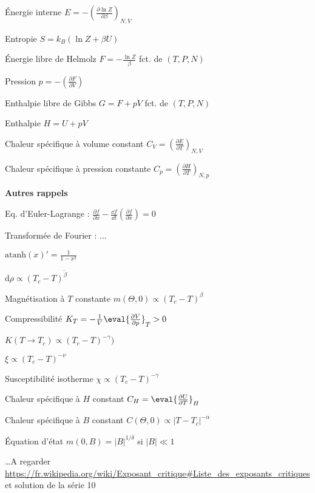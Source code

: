   \squishlist
   \item Énergie interne $E=-\left( \frac{\partial \ln{Z}} { \partial \beta} \right)_{N,V}$
   \item Entropie $S=k_B(\ln{Z}+\beta U)$
   \item Énergie libre de Helmolz $F=-\frac{\ln{Z}} { \beta}$ fct. de $(T,P,N)$
   \item Pression $p=-\left(\frac{\partial F}{\partial V}\right)$
   \item Enthalpie libre de Gibbs $G=F+pV$ fct. de $(T,P,N)$
   \item Enthalpie $H=U+pV$
   \item Chaleur spécifique à volume constant $C_V=\left(\frac{\partial E}{\partial T}\right)_{N,V}$
   \item Chaleur spécifique à pression constante $C_p=\left(\frac{\partial H}{\partial T}\right)_{N,p}$
   \item[] \textbf{Autres rappels}
   \item Eq. d'Euler-Lagrange : $\frac{\partial f}{\partial x}-\frac{\dd f}{\dd t}\left(\frac{\partial f}{\partial \dot x}\right) = 0$
   \item Transformée de Fourier : $\dots$
   \item $\text{atanh}(x)'=\frac{1}{1-x^2}$
  \squishend

  \squishlist
   \item $\text{d}\rho \propto (T_c-T)^{\tilde{\beta}}$
   \item Magnétisation à $T$ constante $m(\Theta,0)\propto(T_c-T)^\beta$
   \item Compressibilité $K_T=-\frac{1}{V}\eval{\frac{\partial V}{\partial p}}_T > 0 $
   \item $K(T\to T_c) \propto (T_c-T)^{-\gamma})$
   \item  $\xi \propto (T_c-T)^{-\nu}$
   \item Susceptibilité isotherme $\chi \propto (T_c-T)^{-\gamma}$
   \item Chaleur spécifique à $H$ constant $C_H=\eval{\frac{\partial U}{\partial T}}_{H}$
   \item Chaleur spécifique à $B$ constant $C(\Theta,0) \propto |T-T_c|^{-\alpha}$
   \item Équation d'état $m(0,B)=|B|^{1/\delta}$ si $|B|\ll1$
   \item \dots A regarder \url{https://fr.wikipedia.org/wiki/Exposant_critique#Liste_des_exposants_critiques} et solution de la série 10
  \squishend
  
